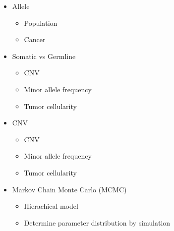 \documentclass[]{article}
\providecommand{\tightlist}{%
  \setlength{\itemsep}{0pt}\setlength{\parskip}{0pt}}
\begin{document}
\begin{itemize}
\tightlist
\item
  Allele

  \begin{itemize}
  \tightlist
  \item
    Population\\
  \item
    Cancer
  \end{itemize}
\item
  Somatic vs Germline

  \begin{itemize}
  \tightlist
  \item
    CNV\\
  \item
    Minor allele frequency\\
  \item
    Tumor cellularity
  \end{itemize}
\item
  CNV

  \begin{itemize}
  \tightlist
  \item
    CNV\\
  \item
    Minor allele frequency\\
  \item
    Tumor cellularity
  \end{itemize}
\item
  Markov Chain Monte Carlo (MCMC)

  \begin{itemize}
  \tightlist
  \item
    Hierachical model\\
  \item
    Determine parameter distribution by simulation
  \end{itemize}
\end{itemize}
\end{document}
